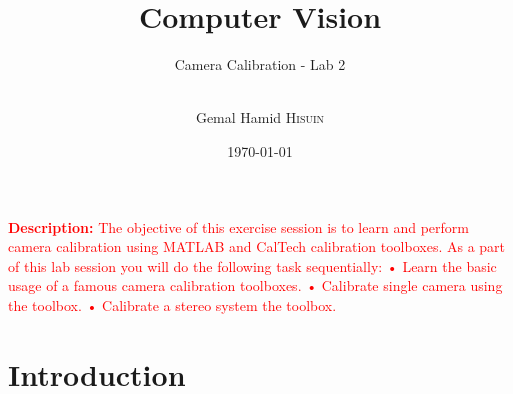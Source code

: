 \documentclass[a4paper, 12pt]{report}
\institute{Jean Monnet University}
\title{Computer Vision}
\subtitle{Camera Calibration - Lab 2}
\author{\textit\\Gemal Hamid \textsc{Hisuin}}
\date{\today}
\begin{document}
    \maketitle

\textcolor{red}{ \textbf{Description:} \newline
The objective of this exercise session is to learn and perform camera calibration using MATLAB and CalTech
calibration toolboxes.
As a part of this lab session you will do the following task sequentially:
• Learn the basic usage of a famous camera calibration toolboxes.
• Calibrate single camera using the toolbox.
• Calibrate a stereo system the toolbox.
}
\newline
\section{Introduction}
\end{document}
